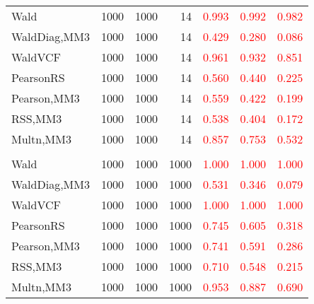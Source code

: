 \documentclass[
]{article}
\begin{document}
\begin{table}[H]
{\begin{tabular}[t]{lrrrrrr}
\hspace{1em}Wald & 1000 & 1000 & 14 & \textcolor{red}{0.993} & \textcolor{red}{0.992} & \textcolor{red}{0.982}\\
\hspace{1em}WaldDiag,MM3 & 1000 & 1000 & 14 & \textcolor{red}{0.429} & \textcolor{red}{0.280} & \textcolor{red}{0.086}\\
\hspace{1em}WaldVCF & 1000 & 1000 & 14 & \textcolor{red}{0.961} & \textcolor{red}{0.932} & \textcolor{red}{0.851}\\
\hspace{1em}PearsonRS & 1000 & 1000 & 14 & \textcolor{red}{0.560} & \textcolor{red}{0.440} & \textcolor{red}{0.225}\\
\hspace{1em}Pearson,MM3 & 1000 & 1000 & 14 & \textcolor{red}{0.559} & \textcolor{red}{0.422} & \textcolor{red}{0.199}\\
\hspace{1em}RSS,MM3 & 1000 & 1000 & 14 & \textcolor{red}{0.538} & \textcolor{red}{0.404} & \textcolor{red}{0.172}\\
\hspace{1em}Multn,MM3 & 1000 & 1000 & 14 & \textcolor{red}{0.857} & \textcolor{red}{0.753} & \textcolor{red}{0.532}\\
\addlinespace[0.3em]
\multicolumn{7}{l}{\textbf{3F 15V}}\\
\hspace{1em}Wald & 1000 & 1000 & 1000 & \textcolor{red}{1.000} & \textcolor{red}{1.000} & \textcolor{red}{1.000}\\
\hspace{1em}WaldDiag,MM3 & 1000 & 1000 & 1000 & \textcolor{red}{0.531} & \textcolor{red}{0.346} & \textcolor{red}{0.079}\\
\hspace{1em}WaldVCF & 1000 & 1000 & 1000 & \textcolor{red}{1.000} & \textcolor{red}{1.000} & \textcolor{red}{1.000}\\
\hspace{1em}PearsonRS & 1000 & 1000 & 1000 & \textcolor{red}{0.745} & \textcolor{red}{0.605} & \textcolor{red}{0.318}\\
\hspace{1em}Pearson,MM3 & 1000 & 1000 & 1000 & \textcolor{red}{0.741} & \textcolor{red}{0.591} & \textcolor{red}{0.286}\\
\hspace{1em}RSS,MM3 & 1000 & 1000 & 1000 & \textcolor{red}{0.710} & \textcolor{red}{0.548} & \textcolor{red}{0.215}\\
\hspace{1em}Multn,MM3 & 1000 & 1000 & 1000 & \textcolor{red}{0.953} & \textcolor{red}{0.887} & \textcolor{red}{0.690}\\
\bottomrule
\end{tabular}}
\endgroup{}
\end{table}
\end{document}
